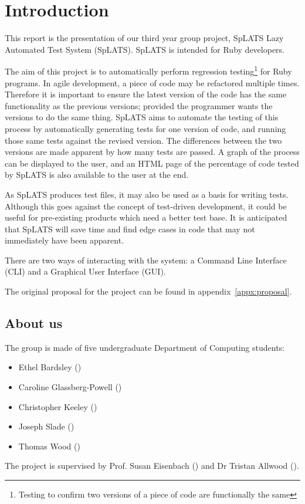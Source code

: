 \chapter{Introduction}

This report is the presentation of our third year group project, SpLATS Lazy Automated Test System (SpLATS). SpLATS is intended for Ruby developers.

The aim of this project is to automatically perform regression testing\footnote{Testing to confirm two versions of a piece of code are functionally the same} for Ruby programs. In agile development, a piece of code may be refactored multiple times. Therefore it is important to ensure the latest version of the code has the same functionality as the previous versions; provided the programmer wants the versions to do the same thing. SpLATS aims to automate the testing of this process by automatically generating tests for one version of code, and running those same tests against the revised version. The differences between the two versions are made apparent by how many tests are passed. A graph of the process can be displayed to the user, and an HTML page of the percentage of code tested by SpLATS is also available to the user at the end.

As SpLATS produces test files, it may also be used as a basis for writing tests. Although this goes against the concept of test-driven development, it could be useful for pre-existing products which need a better test base. It is anticipated that SpLATS will save time and find edge cases in code that may not immediately have been apparent.

There are two ways of interacting with the system: a Command Line Interface (CLI) and a Graphical User Interface (GUI).

The original proposal for the project can be found in appendix~\ref{appx:proposal}.

\section{About us}
  The group is made of five undergraduate Department of Computing students:
  \begin{itemize}
    \item{Ethel Bardsley ()}
    \item{Caroline Glassberg-Powell ()}
    \item{Christopher Keeley ()}
    \item{Joseph Slade ()}
    \item{Thomas Wood ()}
  \end{itemize}

  The project is supervised by Prof. Susan Eisenbach () and Dr Tristan Allwood ().
